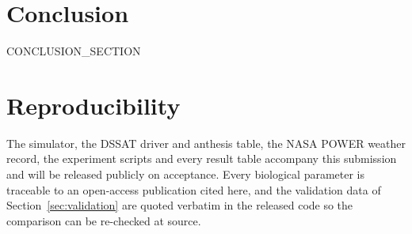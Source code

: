 \documentclass[10pt,twocolumn]{article}
\begin{document}
\section{Conclusion}

CONCLUSION_SECTION

\section*{Reproducibility}
The simulator, the DSSAT driver and anthesis table, the NASA POWER weather
record, the experiment scripts and every result table accompany this
submission and will be released publicly on acceptance. Every biological
parameter is traceable to an open-access publication cited here, and the
validation data of Section~\ref{sec:validation} are quoted verbatim in the
released code so the comparison can be re-checked at source.
\end{document}
